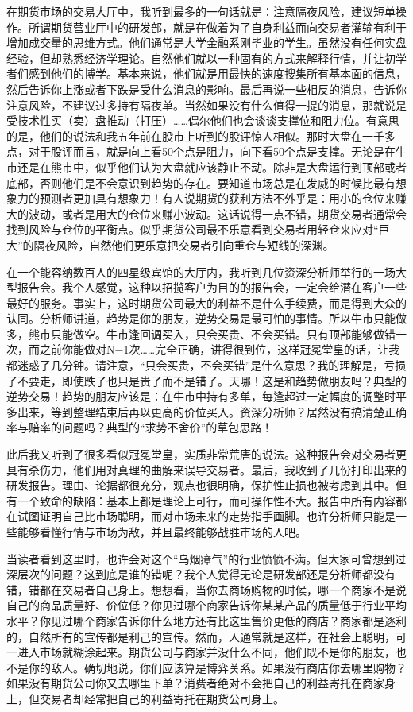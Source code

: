 在期货市场的交易大厅中，我听到最多的一句话就是：注意隔夜风险，建议短单操作。所谓期货营业厅中的研发部，就是在做着为了自身利益而向交易者灌输有利于增加成交量的思维方式。他们通常是大学金融系刚毕业的学生。虽然没有任何实盘经验，但却熟悉经济学理论。自然他们就以一种固有的方式来解释行情，并让初学者们感到他们的博学。基本来说，他们就是用最快的速度搜集所有基本面的信息，然后告诉你上涨或者下跌是受什么消息的影响。最后再说一些相反的消息，告诉你注意风险，不建议过多持有隔夜单。当然如果没有什么值得一提的消息，那就说是受技术性买（卖）盘推动（打压）……偶尔他们也会谈谈支撑位和阻力位。有意思的是，他们的说法和我五年前在股市上听到的股评惊人相似。那时大盘在一千多点，对于股评而言，就是向上看50个点是阻力，向下看50个点是支撑。无论是在牛市还是在熊市中，似乎他们认为大盘就应该静止不动。除非是大盘运行到顶部或者底部，否则他们是不会意识到趋势的存在。要知道市场总是在发威的时候比最有想象力的预测者更加具有想象力！有人说期货的获利方法不外乎是：用小的仓位来赚大的波动，或者是用大的仓位来赚小波动。这话说得一点不错，期货交易者通常会找到风险与仓位的平衡点。似乎期货公司最不乐意看到交易者用轻仓来应对“巨大”的隔夜风险，自然他们更乐意把交易者引向重仓与短线的深渊。

在一个能容纳数百人的四星级宾馆的大厅内，我听到几位资深分析师举行的一场大型报告会。我个人感觉，这种以招揽客户为目的的报告会，一定会给潜在客户一些最好的服务。事实上，这时期货公司最大的利益不是什么手续费，而是得到大众的认同。分析师讲道，趋势是你的朋友，逆势交易是最可怕的事情。所以牛市只能做多，熊市只能做空。牛市逢回调买入，只会买贵、不会买错。只有顶部能够做错一次，而之前你能做对N$-$1次……完全正确，讲得很到位，这样冠冕堂皇的话，让我都迷惑了几分钟。请注意，“只会买贵，不会买错”是什么意思？我的理解是，亏损了不要走，即使跌了也只是贵了而不是错了。天哪！这是和趋势做朋友吗？典型的逆势交易！趋势的朋友应该是：在牛市中持有多单，每逢超过一定幅度的调整时平多出来，等到整理结束后再以更高的价位买入。资深分析师？居然没有搞清楚正确率与赔率的问题吗？典型的“求势不舍价”的草包思路！

此后我又听到了很多看似冠冕堂皇，实质非常荒唐的说法。这种报告会对交易者更具有杀伤力，他们用对真理的曲解来误导交易者。最后，我收到了几份打印出来的研发报告。理由、论据都很充分，观点也很明确，保护性止损也被考虑到其中。但有一个致命的缺陷：基本上都是理论上可行，而可操作性不大。报告中所有内容都在试图证明自己比市场聪明，而对市场未来的走势指手画脚。也许分析师只能是一些能够看懂行情与市场为敌，并且最终能够战胜市场的人吧。

当读者看到这里时，也许会对这个“乌烟瘴气”的行业愤愤不满。但大家可曾想到过深层次的问题？这到底是谁的错呢？我个人觉得无论是研发部还是分析师都没有错，错都在交易者自己身上。想想看，当你去商场购物的时候，哪一个商家不是说自己的商品质量好、价位低？你见过哪个商家告诉你某某产品的质量低于行业平均水平？你见过哪个商家告诉你什么地方还有比这里售价更低的商店？商家都是逐利的，自然所有的宣传都是利己的宣传。然而，人通常就是这样，在社会上聪明，可一进入市场就糊涂起来。期货公司与商家并没什么不同，他们既不是你的朋友，也不是你的敌人。确切地说，你们应该算是博弈关系。如果没有商店你去哪里购物？如果没有期货公司你又去哪里下单？消费者绝对不会把自己的利益寄托在商家身上，但交易者却经常把自己的利益寄托在期货公司身上。

